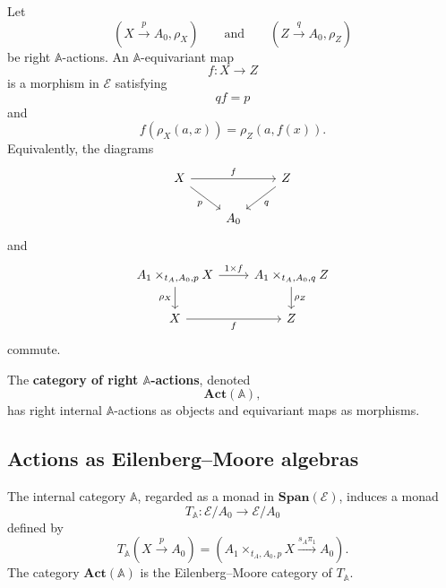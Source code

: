 \begin{definition}
\label{def:relative-equivariant-map}
Let
\[
(X\xrightarrow{p}A_0,\rho_X)
\qquad\text{and}\qquad
(Z\xrightarrow{q}A_0,\rho_Z)
\]
be right \(\mathbb A\)-actions. An \(\mathbb A\)-equivariant map
\[
f:X\to Z
\]
is a morphism in \(\mathcal E\) satisfying
\[
qf=p
\]
and
\[
f(\rho_X(a,x))=\rho_Z(a,f(x)).
\]
Equivalently, the diagrams
\[
\begin{tikzcd}
X \arrow[rr,"f"] \arrow[dr,"p"'] && Z \arrow[dl,"q"] \\
& A_0 &
\end{tikzcd}
\]
and
\[
\begin{tikzcd}
A_1\times_{t_A,A_0,p}X
\arrow[r,"1\times f"]
\arrow[d,"\rho_X"']
&
A_1\times_{t_A,A_0,q}Z
\arrow[d,"\rho_Z"]
\\
X
\arrow[r,"f"']
&
Z
\end{tikzcd}
\]
commute.
\end{definition}

\begin{definition}
\label{def:relative-action-category-external}
The \textbf{category of right \(\mathbb A\)-actions}, denoted
\[
\mathbf{Act}(\mathbb A),
\]
has right internal \(\mathbb A\)-actions as objects and equivariant maps as
morphisms.
\end{definition}

\subsection{Actions as Eilenberg--Moore algebras}
\label{subsec:relative-actions-em}

\begin{proposition}
\label{prop:relative-actions-em}
The internal category \(\mathbb A\), regarded as a monad in
\(\mathbf{Span}(\mathcal E)\), induces a monad
\[
T_{\mathbb A}:\mathcal E/A_0\to\mathcal E/A_0
\]
defined by
\[
T_{\mathbb A}(X\xrightarrow{p}A_0)
=
\left(
A_1\times_{t_A,A_0,p}X
\xrightarrow{s_A\pi_1}
A_0
\right).
\]
The category \(\mathbf{Act}(\mathbb A)\) is the Eilenberg--Moore category of
\(T_{\mathbb A}\).
\end{proposition}

